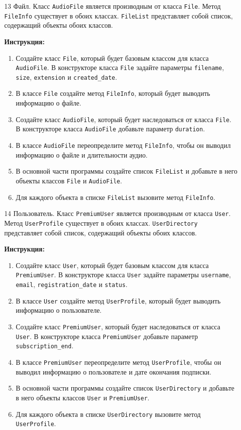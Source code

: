 \begin{enumerate}
\item[13]
Файл. Класс \texttt{AudioFile} является производным от класса \texttt{File}. Метод \texttt{FileInfo} существует в обоих классах. \texttt{FileList} представляет собой список, содержащий объекты обоих классов.

\textbf{Инструкция:}
\begin{enumerate}
    \item Создайте класс \texttt{File}, который будет базовым классом для класса \texttt{AudioFile}. В конструкторе класса \texttt{File} задайте параметры \texttt{filename}, \texttt{size}, \texttt{extension} и \texttt{created\_date}.
    \item В классе \texttt{File} создайте метод \texttt{FileInfo}, который будет выводить информацию о файле.
    \item Создайте класс \texttt{AudioFile}, который будет наследоваться от класса \texttt{File}. В конструкторе класса \texttt{AudioFile} добавьте параметр \texttt{duration}.
    \item В классе \texttt{AudioFile} переопределите метод \texttt{FileInfo}, чтобы он выводил информацию о файле и длительности аудио.
    \item В основной части программы создайте список \texttt{FileList} и добавьте в него объекты классов \texttt{File} и \texttt{AudioFile}.
    \item Для каждого объекта в списке \texttt{FileList} вызовите метод \texttt{FileInfo}.
\end{enumerate}

\item[14]
Пользователь. Класс \texttt{PremiumUser} является производным от класса \texttt{User}. Метод \texttt{UserProfile} существует в обоих классах. \texttt{UserDirectory} представляет собой список, содержащий объекты обоих классов.

\textbf{Инструкция:}
\begin{enumerate}
    \item Создайте класс \texttt{User}, который будет базовым классом для класса \texttt{PremiumUser}. В конструкторе класса \texttt{User} задайте параметры \texttt{username}, \texttt{email}, \texttt{registration\_date} и \texttt{status}.
    \item В классе \texttt{User} создайте метод \texttt{UserProfile}, который будет выводить информацию о пользователе.
    \item Создайте класс \texttt{PremiumUser}, который будет наследоваться от класса \texttt{User}. В конструкторе класса \texttt{PremiumUser} добавьте параметр \texttt{subscription\_end}.
    \item В классе \texttt{PremiumUser} переопределите метод \texttt{UserProfile}, чтобы он выводил информацию о пользователе и дате окончания подписки.
    \item В основной части программы создайте список \texttt{UserDirectory} и добавьте в него объекты классов \texttt{User} и \texttt{PremiumUser}.
    \item Для каждого объекта в списке \texttt{UserDirectory} вызовите метод \texttt{UserProfile}.
\end{enumerate}


\end{enumerate}

